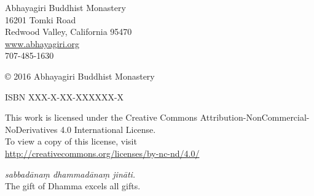 \thispagestyle{empty}
{\raggedright\small
\parindent 0pt

Abhayagiri Buddhist Monastery\\
16201 Tomki Road\\
Redwood Valley, California 95470\\
\href{http://www.abhayagiri.org}{www.abhayagiri.org}\\
707-485-1630

\vspace{1em}
© 2016 Abhayagiri Buddhist Monastery

\vspace{1em}
ISBN XXX-X-XX-XXXXXX-X

\vspace{1em}
This work is licensed under the Creative Commons
Attribution-NonCommercial-NoDerivatives 4.0 International License.\\
To view a copy of this license, visit\\
\href{http://creativecommons.org/licenses/by-nc-nd/4.0}
{http://creativecommons.org/licenses/by-nc-nd/4.0/}

\vspace{1em}
\emph{sabbadānaṃ dhammadānaṃ jināti.}\\
The gift of Dhamma excels all gifts.

}
\clearpage
